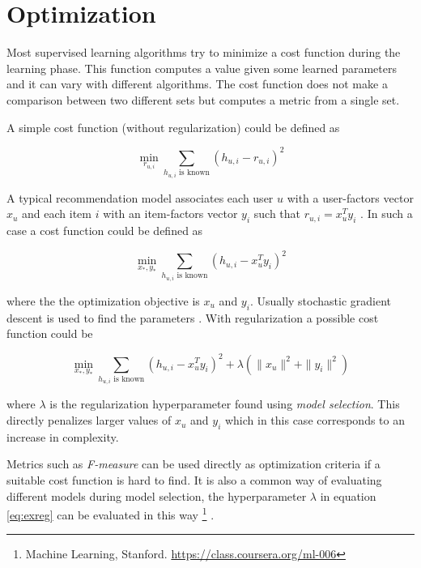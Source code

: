 
\section{Optimization}\label{sec:background:opt}

Most supervised learning algorithms try to minimize a cost function during the learning phase. This function computes a value given some learned parameters and it can vary with different algorithms. The cost function does not make a comparison between two different sets but computes a metric from a single set.

A simple cost function (without regularization) could be defined as

\begin{equation}\label{eq:simple_cost}
    \min_{r_{u, i}} \sum_{h_{u,i} \text{ is known} } (h_{u, i} - r_{u, i})^2
\end{equation}

A typical recommendation model associates each user $u$ with a user-factors vector $x_u$ and each item $i$ with an item-factors vector $y_i$ such that $r_{u, i} = x_u^T y_i$
\citep{hu2008collaborative}. In such a case a cost function could be defined as

\begin{equation}
    \min_{x_*, y_*} \sum_{h_{u,i} \text{ is known} } (h_{u, i} - x_{u}^T y_i)^2
\end{equation}

where the the optimization objective is $x_u$ and $y_i$. Usually stochastic gradient descent \psgd is used to find the parameters \cite{hu2008collaborative}. With regularization a possible cost function could be

\begin{equation}\label{eq:exreg}
    \min_{x_*, y_*} \sum_{h_{u,i} \text{ is known} } (h_{u, i} - x_{u}^T y_i)^2 + \lambda(\|x_u\|^2 + \|y_i\|^2)
\end{equation}

where $\lambda$ is the regularization hyperparameter found using \textit{model selection}. This directly penalizes larger values of $x_u$ and $y_i$ which in this case corresponds to an increase in complexity.

Metrics such as \textit{F-measure} can be used directly as optimization criteria if a suitable cost function is hard to find. It is also a common way of evaluating different models during model selection, the hyperparameter $\lambda$ in equation \eqref{eq:exreg} can be evaluated in this way
\footnote{Machine Learning, Stanford. \url{https://class.coursera.org/ml-006}}
.

